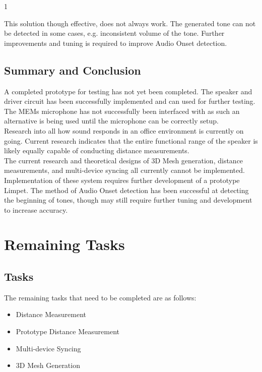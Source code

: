1\documentclass{article}
\begin{document}
This solution though effective, does not always work. The generated tone can not be detected in some cases, e.g. inconsistent volume of the tone. Further improvements and tuning is required to improve Audio Onset detection. 

\subsection{Summary and Conclusion}
A completed prototype for testing has not yet been completed. The speaker and driver circuit has been successfully implemented and can used for further testing. The MEMs microphone has not successfully been interfaced with as such an alternative is being used until the microphone can be correctly setup.\\

Research into all how sound responds in an office environment is currently on going. Current research indicates that the entire functional range of the speaker is likely equally capable of conducting distance measurements.\\

The current research and theoretical designs of 3D Mesh generation, distance measurements, and multi-device syncing all currently cannot be implemented. Implementation of these system requires further development of a prototype Limpet. The method of Audio Onset detection has been successful at detecting the beginning of tones, though may still require further tuning and development to increase accuracy.



\pagebreak
\section{Remaining Tasks}
\subsection{Tasks}
The remaining tasks that need to be completed are as follows:

\begin{itemize}
\item Distance Measurement
\item Prototype Distance Measurement
\item Multi-device Syncing
\item 3D Mesh Generation
\end{itemize}
\end{document}
